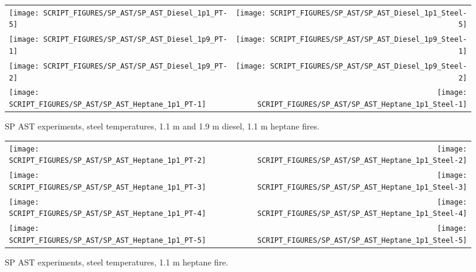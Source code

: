 \begin{figure}[p]
\begin{tabular*}{\textwidth}{l@{\extracolsep{\fill}}r}
\texttt{[image: SCRIPT\_FIGURES/SP\_AST/SP\_AST\_Diesel\_1p1\_PT-5]}  &  \texttt{[image: SCRIPT\_FIGURES/SP\_AST/SP\_AST\_Diesel\_1p1\_Steel-5]}   \\
\texttt{[image: SCRIPT\_FIGURES/SP\_AST/SP\_AST\_Diesel\_1p9\_PT-1]}  &  \texttt{[image: SCRIPT\_FIGURES/SP\_AST/SP\_AST\_Diesel\_1p9\_Steel-1]}   \\
\texttt{[image: SCRIPT\_FIGURES/SP\_AST/SP\_AST\_Diesel\_1p9\_PT-2]}  &  \texttt{[image: SCRIPT\_FIGURES/SP\_AST/SP\_AST\_Diesel\_1p9\_Steel-2]}   \\
\texttt{[image: SCRIPT\_FIGURES/SP\_AST/SP\_AST\_Heptane\_1p1\_PT-1]} &  \texttt{[image: SCRIPT\_FIGURES/SP\_AST/SP\_AST\_Heptane\_1p1\_Steel-1]}
\end{tabular*}
\caption[SP AST experiments, steel temperatures, 1.1 m and 1.9 m diesel, 1.1 m heptane fires]{SP AST experiments, steel temperatures, 1.1 m and 1.9 m diesel, 1.1 m heptane fires.}
\label{SP_Diesel_1p9_PT_Steel}
\end{figure}

\begin{figure}[p]
\begin{tabular*}{\textwidth}{l@{\extracolsep{\fill}}r}
\texttt{[image: SCRIPT\_FIGURES/SP\_AST/SP\_AST\_Heptane\_1p1\_PT-2]} &  \texttt{[image: SCRIPT\_FIGURES/SP\_AST/SP\_AST\_Heptane\_1p1\_Steel-2]}  \\
\texttt{[image: SCRIPT\_FIGURES/SP\_AST/SP\_AST\_Heptane\_1p1\_PT-3]} &  \texttt{[image: SCRIPT\_FIGURES/SP\_AST/SP\_AST\_Heptane\_1p1\_Steel-3]}  \\
\texttt{[image: SCRIPT\_FIGURES/SP\_AST/SP\_AST\_Heptane\_1p1\_PT-4]} &  \texttt{[image: SCRIPT\_FIGURES/SP\_AST/SP\_AST\_Heptane\_1p1\_Steel-4]}  \\
\texttt{[image: SCRIPT\_FIGURES/SP\_AST/SP\_AST\_Heptane\_1p1\_PT-5]} &  \texttt{[image: SCRIPT\_FIGURES/SP\_AST/SP\_AST\_Heptane\_1p1\_Steel-5]}
\end{tabular*}
\caption[SP AST experiments, steel temperatures, 1.1 m heptane fire]{SP AST experiments, steel temperatures, 1.1 m heptane fire.}
\label{SP_Heptane_1p1_PT_Steel}
\end{figure}

\clearpage

